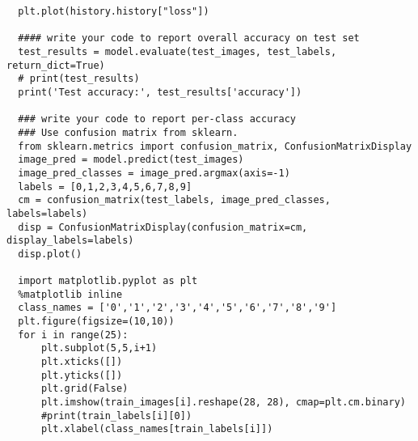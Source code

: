 \begin{lstlisting}
  plt.plot(history.history["loss"])

  #### write your code to report overall accuracy on test set
  test_results = model.evaluate(test_images, test_labels, return_dict=True)
  # print(test_results)
  print('Test accuracy:', test_results['accuracy'])

  ### write your code to report per-class accuracy
  ### Use confusion matrix from sklearn. 
  from sklearn.metrics import confusion_matrix, ConfusionMatrixDisplay
  image_pred = model.predict(test_images)
  image_pred_classes = image_pred.argmax(axis=-1)
  labels = [0,1,2,3,4,5,6,7,8,9]
  cm = confusion_matrix(test_labels, image_pred_classes, labels=labels)
  disp = ConfusionMatrixDisplay(confusion_matrix=cm, display_labels=labels)
  disp.plot()

  import matplotlib.pyplot as plt
  %matplotlib inline
  class_names = ['0','1','2','3','4','5','6','7','8','9']
  plt.figure(figsize=(10,10))
  for i in range(25):
      plt.subplot(5,5,i+1)
      plt.xticks([])
      plt.yticks([])
      plt.grid(False)
      plt.imshow(train_images[i].reshape(28, 28), cmap=plt.cm.binary)
      #print(train_labels[i][0])
      plt.xlabel(class_names[train_labels[i]])
\end{lstlisting}
\clearpage